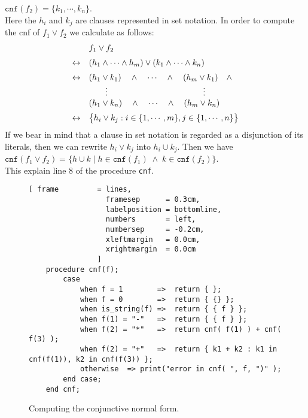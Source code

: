 \begin{enumerate}
      $\mathtt{cnf}(f_2) = \{ k_1, \cdots, k_n \}$. \\[0.2cm]
      Here the  $h_i$ and $k_j$ are clauses represented in set notation.  In order to compute the
      cnf of $f_1 \vee f_2$ we calculate as follows: 
      $$
      \begin{array}[c]{ll}
        & f_1 \vee f_2  \\[0.2cm]
      \leftrightarrow & (h_1 \wedge \cdots \wedge h_m) \vee (k_1 \wedge \cdots \wedge k_n) \\[0.2cm]
      \leftrightarrow & (h_1 \vee k_1) \quad \wedge \quad \cdots \quad \wedge \quad (h_m \vee k_1) \quad \wedge \\ 
                      & \qquad \vdots     \hspace*{4cm} \vdots                \\
                      & (h_1 \vee k_n) \quad \wedge \quad \cdots \quad \wedge \quad (h_m \vee k_n) \\[0.2cm] 
      \leftrightarrow & \bigl\{ h_i \vee k_j : i \in \{ 1, \cdots, m\}, j \in \{ 1, \cdots, n \} \bigr\} \\ 
      \end{array}
      $$
      If we bear in mind that a clause in set notation is regarded as a disjunction of its literals,
      then we can rewrite $h_i \vee k_j$ into $h_i \cup k_j$.  Then we have \\[0.2cm]
      \hspace*{1.3cm} 
      $\mathtt{cnf}(f_1 \vee f_2) = \bigl\{ h \cup k \mid h \in \mathtt{cnf}(f_1) \;\wedge\; k \in \mathtt{cnf}(f_2) \bigr\}$.
      \\[0.2cm]
      This explain line 8 of the procedure \texttt{cnf}.
\end{enumerate}

\begin{figure}[!ht]
  \centering
\begin{Verbatim}[ frame         = lines, 
                  framesep      = 0.3cm, 
                  labelposition = bottomline,
                  numbers       = left,
                  numbersep     = -0.2cm,
                  xleftmargin   = 0.0cm,
                  xrightmargin  = 0.0cm
                ]
    procedure cnf(f);
        case
            when f = 1        =>  return { };
            when f = 0        =>  return { {} };
            when is_string(f) =>  return { { f } };
            when f(1) = "-"   =>  return { { f } };
            when f(2) = "*"   =>  return cnf( f(1) ) + cnf( f(3) );
            when f(2) = "+"   =>  return { k1 + k2 : k1 in cnf(f(1)), k2 in cnf(f(3)) };
            otherwise  => print("error in cnf( ", f, ")" );
        end case;
    end cnf;
\end{Verbatim}
\vspace*{-0.3cm}
  \caption{Computing the conjunctive normal form.}
  \label{fig:cnf}
\end{figure}

